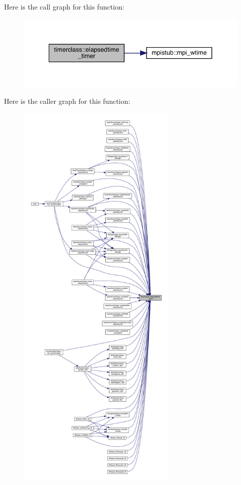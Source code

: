 Here is the call graph for this function\+:\nopagebreak
\begin{figure}[H]
\begin{center}
\leavevmode
\includegraphics[width=341pt]{namespacetimerclass_a3378d323d442f85aff95ab73cd13376d_cgraph}
\end{center}
\end{figure}
Here is the caller graph for this function\+:\nopagebreak
\begin{figure}[H]
\begin{center}
\leavevmode
\includegraphics[height=550pt]{namespacetimerclass_a3378d323d442f85aff95ab73cd13376d_icgraph}
\end{center}
\end{figure}
\mbox{\label{namespacetimerclass_a3535b11970327778ddd27cee93c2288b}} 
